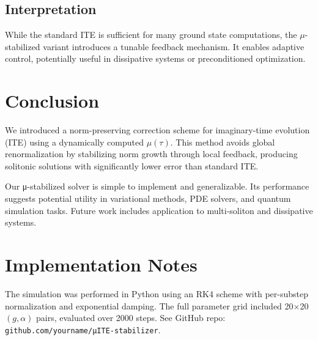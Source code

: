 \documentclass[11pt]{article}
\begin{document}
\newpage
\subsection{Interpretation}
While the standard ITE is sufficient for many ground state computations, the $\mu$-stabilized variant introduces a tunable feedback mechanism. It enables adaptive control, potentially useful in dissipative systems or preconditioned optimization.

\section{Conclusion}

We introduced a norm-preserving correction scheme for imaginary-time evolution (ITE) using a dynamically computed $\mu(\tau)$. This method avoids global renormalization by stabilizing norm growth through local feedback, producing solitonic solutions with significantly lower error than standard ITE. 

Our μ-stabilized solver is simple to implement and generalizable. Its performance suggests potential utility in variational methods, PDE solvers, and quantum simulation tasks. Future work includes application to multi-soliton and dissipative systems.

\appendix
\section{Implementation Notes}

The simulation was performed in Python using an RK4 scheme with per-substep normalization and exponential damping. The full parameter grid included 20×20 $(g, \alpha)$ pairs, evaluated over 2000 steps. See GitHub repo: \texttt{github.com/yourname/μITE-stabilizer}.
\end{document}
